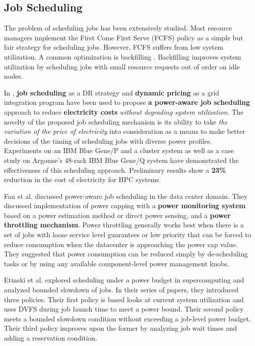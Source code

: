 \subsection{Job Scheduling}
The problem of scheduling jobs has been extensively studied. Most resource managers implement the First Come First Serve (FCFS) policy
as a simple but fair strategy for scheduling jobs. However, FCFS suffers from low system utilization. A common optimization is backfilling
\cite{lifka_anl/ibm_1995,mualem_utilization_2001,feitelson_parallel_2004}. Backfilling improves system utilization by scheduling jobs with small resource requests out of order on idle nodes.

In \cite{yang_integrating_2013} \cite{zhou_reducing_2013}, \textbf{job scheduling} as a DR strategy and
\textbf{dynamic pricing} as a grid integration program have been used to
propose \textbf{a power-aware job scheduling} approach to reduce
\textbf{electricity costs} \textit{without degrading system utilization}. 
The novelty of the proposed job scheduling
mechanism is its ability to take \textit{the variation of 
the price of electricity }into consideration as a means to make
better decisions of the timing of scheduling jobs with diverse power
profiles. Experiments on an IBM Blue Gene/P and a cluster system as
well as a case study on Argonne's 48-rack IBM Blue Gene/Q system have
demonstrated the effectiveness of this scheduling approach. Preliminary
results show a \textbf{23{\%}} reduction in the cost of electricity for HPC systems.

Fan et al. \cite{PowerAwareServer1} discussed power-aware job scheduling in the data center domain. 
They discussed implementation of power capping with a \textbf{power monitoring system} based on a power estimation
method or direct power sensing, and a \textbf{power throttling mechanism}. Power throttling generally works best when there is 
a set of jobs with loose service level guarantees or low priority that can be
forced to reduce consumption when the datacenter is approaching the power cap value. They suggested that power consumption 
can be reduced simply by de-scheduling tasks or by using any available component-level power management knobs.

Etinski et al. \cite{Etinski1,Etinski2,Etinski3,Etinski4} explored scheduling under a power budget in supercomputing and analyzed bounded slowdown of jobs. In their series of papers, they introduced three policies. Their first policy is based looks at current system utilization and uses DVFS during job launch time to meet a power bound. Their second policy meets a bounded slowdown condition without exceeding a job-level power budget. Their third policy improves upon the former by analyzing job wait times and adding a reservation condition. 

